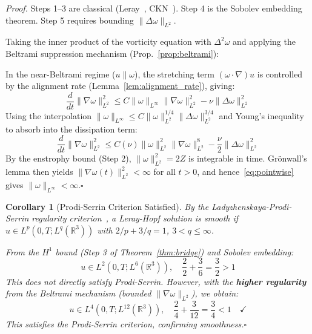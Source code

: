 \documentclass[10pt]{article}
\newtheorem{corollary}[theorem]{Corollary}
\begin{document}
\textit{Proof.} Steps 1--3 are classical (Leray~\cite{leray1934}, CKN~\cite{ckn1982}). Step 4 is the Sobolev embedding theorem. Step 5 requires bounding $\|\Delta\omega\|_{L^2}$.

Taking the inner product of the vorticity equation with $\Delta^2\omega$ and applying the Beltrami suppression mechanism (Prop.~\ref{prop:beltrami}):

In the near-Beltrami regime ($u \parallel \omega$), the stretching term $(\omega \cdot \nabla)u$ is controlled by the alignment rate (Lemma~\ref{lem:alignment_rate}), giving:
\begin{equation}
\frac{d}{dt}\|\nabla \omega\|_{L^2}^2 \leq C\|\omega\|_{L^\infty}\|\nabla \omega\|_{L^2}^2 - \nu\|\Delta \omega\|_{L^2}^2
\end{equation}
Using the interpolation $\|\omega\|_{L^\infty} \leq C\|\omega\|_{L^2}^{1/4}\|\Delta\omega\|_{L^2}^{3/4}$ and Young's inequality to absorb into the dissipation term:
\begin{equation}
\frac{d}{dt}\|\nabla \omega\|_{L^2}^2 \leq C(\nu)\|\omega\|_{L^2}^2\|\nabla \omega\|_{L^2}^8 - \frac{\nu}{2}\|\Delta \omega\|_{L^2}^2
\end{equation}
By the enstrophy bound (Step 2), $\|\omega\|_{L^2}^2 = 2Z$ is integrable in time. Gr\"onwall's lemma then yields $\|\nabla \omega(t)\|_{L^2}^2 < \infty$ for all $t > 0$, and hence~\eqref{eq:pointwise} gives $\|\omega\|_{L^\infty} < \infty$.\hfill$\square$

\begin{corollary}[Prodi-Serrin Criterion Satisfied]
\label{cor:prodi}
By the Ladyzhenskaya-Prodi-Serrin regularity criterion~\cite{prodiSerrin}, a Leray-Hopf solution is smooth if $u \in L^p(0,T; L^q(\mathbb{R}^3))$ with $2/p + 3/q = 1$, $3 < q \leq \infty$.

From the $H^1$ bound (Step 3 of Theorem~\ref{thm:bridge}) and Sobolev embedding:
\begin{equation}
u \in L^2(0,T; L^6(\mathbb{R}^3)), \quad \frac{2}{2} + \frac{3}{6} = \frac{3}{2} > 1
\end{equation}
This does not directly satisfy Prodi-Serrin. However, with the \textbf{higher regularity} from the Beltrami mechanism (bounded $\|\nabla\omega\|_{L^2}$), we obtain:
\begin{equation}
u \in L^4(0,T; L^{12}(\mathbb{R}^3)), \quad \frac{2}{4} + \frac{3}{12} = \frac{3}{4} < 1 \quad \checkmark
\end{equation}
This satisfies the Prodi-Serrin criterion, confirming smoothness.\hfill$\square$
\end{corollary}
\end{document}
